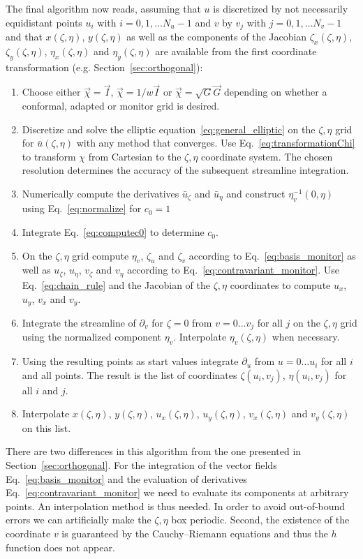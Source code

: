 The final algorithm now reads, assuming that $u$ is discretized
by not necessarily equidistant points $u_i$ with $i=0,1,\dots N_u-1$ and 
$v$ by $v_j$ with $j=0,1,\dots N_v-1$ and that $x(\zeta,\eta)$, $y(\zeta, \eta)$
as well as the components of the Jacobian $\zeta_x(\zeta,\eta)$, $\zeta_y(\zeta,\eta)$, $\eta_x(\zeta,\eta)$ and $\eta_y(\zeta,\eta)$ are available from the first coordinate transformation (e.g. Section~\ref{sec:orthogonal}):
\begin{enumerate}
  \item Choose either $\vec \chi = \vec I$, $\vec \chi=1/w\vec I$ or $\vec \chi = \sqrt{G}\vec G$ depending on whether a conformal, adapted or monitor grid is desired.
  \item Discretize and solve the elliptic equation~\eqref{eq:general_elliptic} on the $\zeta,\eta$ grid for $\bar u(\zeta, \eta)$ with any
    method that converges.  
    Use Eq.~\eqref{eq:transformationChi} to transform $\chi$ from Cartesian 
    to the $\zeta, \eta$ coordinate system.
    The chosen resolution
    determines the accuracy of the subsequent streamline integration.
  \item Numerically compute the derivatives $\bar u_\zeta$ and $\bar u_\eta$ 
    and construct $\eta_v^{-1}(0, \eta)$ using Eq.~\eqref{eq:normalize} for $c_0=1$
  \item Integrate Eq.~\eqref{eq:computec0} to determine $c_0$.
  \item On the $\zeta, \eta$ grid compute $\eta_v$, $\zeta_u$ and $\zeta_v$ according to Eq.~\eqref{eq:basis_monitor} as well as $u_\zeta$, $u_\eta$, $v_\zeta$ and
    $v_\eta$ according to Eq.~\eqref{eq:contravariant_monitor}. Use Eq.~\eqref{eq:chain_rule} and the Jacobian of the $\zeta, \eta$ coordinates to compute $u_x$, $u_y$, $v_x$ and $v_y$.
  \item Integrate the streamline of $\partial_v$ for $\zeta=0$ 
    from $v=0\dots v_j$ for all $j$ on the $\zeta, \eta$ grid using the normalized component $\eta_v$. 
    Interpolate $\eta_v(\zeta, \eta)$ when necessary.
  \item Using the resulting points as start values integrate $\partial_u$ from 
    $u=0\dots u_i$ for all $i$ and all points. The result is the list
    of coordinates $\zeta(u_i, v_j)$, $\eta(u_i, v_j)$ for all $i$ and $j$.
  \item Interpolate $x\left( \zeta,\eta \right)$, $y\left( \zeta, \eta \right)$, 
    $u_x(\zeta, \eta)$, $u_y(\zeta, \eta)$, $v_x(\zeta, \eta)$ and $v_y(\zeta, \eta)$ on this list. 
\end{enumerate}
There are two differences in this algorithm from the one presented in 
Section~\ref{sec:orthogonal}.
For the integration of the vector fields Eq.~\eqref{eq:basis_monitor} and the evaluation of derivatives Eq.~\eqref{eq:contravariant_monitor} we need to evaluate its components at arbitrary points.
An interpolation method is thus needed. 
In order to avoid out-of-bound errors we can artificially make the $\zeta,\eta$ box periodic.
Second, the existence of the coordinate $v$ is guaranteed by the Cauchy--Riemann equations
and thus the $h$ function does not appear. 

